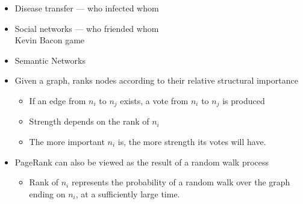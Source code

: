 \documentclass[a4paper,landscape,headrule,footrule,xetex]{foils}
\begin{document}








\begin{itemize}
\item Disease transfer --- who infected whom
\item Social networks --- who friended whom 
  \\ Kevin Bacon game
\item Semantic Networks 
\end{itemize}

\MyLogo{}
\begin{itemize}
\item Given a graph, ranks nodes according to their relative structural
  importance
  \begin{itemize}
  \item If an edge from $n_i$ to $n_j$ exists, a vote from $n_i$ to $n_j$ is produced
  \item Strength depends on the rank of $n_i$
  \item The more important  $n_i$ is, the more strength its votes will have.
  \end{itemize}
\item PageRank can also be viewed as the result of a random walk process
  \begin{itemize}
  \item Rank of  $n_i$ represents the probability of a random walk over the graph ending
    on  $n_i$, at a sufficiently large time.
  \end{itemize}
\end{itemize}
\end{document}
